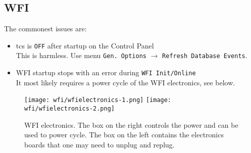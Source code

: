 \documentclass[11pt,fleqn]{book}
\begin{document}
\subsection{WFI}

The commonest issues are:
\begin{itemize}
  \item \gls{tcs} is \texttt{OFF} after startup on the Control Panel\\
   This is harmless. Use menu \texttt{Gen. Options} $\rightarrow$ \texttt{Refresh Database Events}.
  \item WFI startup stops with an error during \texttt{WFI Init/Online}\\
       It most likely requires a power cycle of the WFI electronics, see below.
\end{itemize}

\begin{figure}[ht]
	\texttt{[image: wfi/wfielectronics-1.png]}
	\linewidth
	\texttt{[image: wfi/wfielectronics-2.png]}
	\caption[WFI electronics: power cycle button and boards]{WFI electronics.  The box on the right controls the power and can be used to power cycle.
The box on the left contains the electronics boards that one may need to unplug and replug.}
	\label{fig:wfielectronics}
\end{figure}
\end{document}
